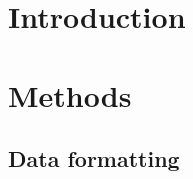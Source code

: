 \documentclass{article}
\begin{document}
\section{Introduction}
\section{Methods}
\subsection{Data formatting}
\end{document}
